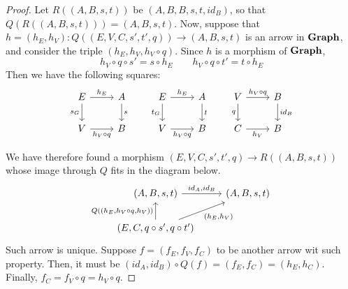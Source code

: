 \begin{proof}
    Let $R((A, B, s, t))$ be $(A, B, B, s, t, id_B)$, so that $Q(R((A, B, s, t))) = (A, B, s, t)$. Now, suppose that $h = (h_E, h_V): Q((E, V, C, s', t', q)) \to (A, B, s, t)$  is an arrow in $\mathbf{Graph}$, and consider the triple $(h_E, h_V, h_V \circ q)$. Since $h$ is a morphism of $\mathbf{Graph}$, 
    \[h_V\circ q\circ s'= s\circ h_E \qquad  h_V\circ q\circ t' = t\circ h_E\]
    Then we have the following squares:
    \[
        \begin{tikzcd}
            E \arrow[r, "{h_E}"] \arrow[d, "{s_G}"swap] & A \arrow[d, "s"] \\
            V \arrow[r, "{h_V \circ q}"swap] & B
        \end{tikzcd}
        \qquad
        \begin{tikzcd}
            E \arrow[r, "{h_E}"] \arrow[d, "{t_G}"swap] & A \arrow[d, "t"] \\
            V \arrow[r, "{h_V \circ q}"swap] & B
        \end{tikzcd}
        \qquad
        \begin{tikzcd}
            V \arrow[r, "{h_V\circ q}"] \arrow[d, "q" swap] & B \arrow[d, "{id_B}"] \\
            C \arrow[r, "{h_V}"swap] & B
        \end{tikzcd}
    \]

    We have therefore found a morphism $(E, V, C, s', t', q) \to R((A, B, s, t))$ whose image through $Q$ fits in the diagram below.
    \[
        \begin{tikzcd}
            (A, B, s, t) \arrow[r, "{id_A, id_B}"] & (A, B, s, t)\\
            (E, C, q\circ s', q\circ t') \arrow[u, "{Q((h_E, h_V \circ q, h_V))}"] \arrow[ur, "{(h_E, h_V)}" swap] 
        \end{tikzcd}
    \]
    Such arrow is unique. Suppose $f = (f_E, f_V, f_C)$ to be another arrow wit such property. Then, it must be $(id_A, id_B) \circ Q(f) = (f_E, f_C) = (h_E, h_C)$. Finally, $f_C = f_V \circ q = h_V \circ q$. 
\end{proof}

